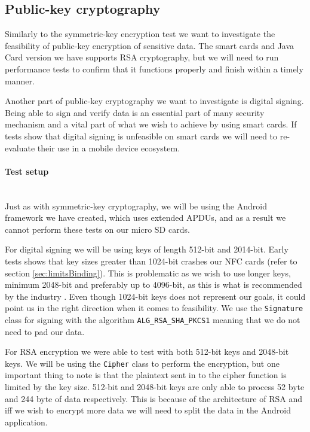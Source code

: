 \subsection{Public-key cryptography}
\label{sec:AsymmetricTest}
Similarly to the symmetric-key encryption test we want to investigate the feasibility of public-key encryption of sensitive data. The smart cards and Java Card version we have supports RSA cryptography, but we will need to run performance tests to confirm that it functions properly and finish within a timely manner.

Another part of public-key cryptography we want to investigate is digital signing. Being able to sign and verify data is an essential part of many security mechanism and a vital part of what we wish to achieve by using smart cards. If tests show that digital signing is unfeasible on smart cards we will need to re-evaluate their use in a mobile device ecosystem.

\paragraph{Test setup}\mbox{}\\
Just as with symmetric-key cryptography, we will be using the Android framework we have created, which uses extended APDUs, and as a result we cannot perform these tests on our micro SD cards.

For digital signing we will be using keys of length 512-bit and 2014-bit. Early tests shows that key sizes greater than 1024-bit crashes our NFC cards (refer to section \ref{sec:limitsBinding}). This is problematic as we wish to use longer keys, minimum 2048-bit and preferably up to 4096-bit, as this is what is recommended by the industry \cite{rsaRec}. Even though 1024-bit keys does not represent our goals, it could point us in the right direction when it comes to feasibility. We use the \texttt{Signature} class for signing with the algorithm \texttt{ALG\_RSA\_SHA\_PKCS1} meaning that we do not need to pad our data.

For RSA encryption we were able to test with both 512-bit keys and 2048-bit keys. We will be using the \texttt{Cipher} class to perform the encryption, but one important thing to note is that the plaintext sent in to the cipher function is limited by the key size. 512-bit and 2048-bit keys are only able to process 52 byte and 244 byte of data respectively. This is because of the architecture of RSA and iff we wish to encrypt more data we will need to split the data in the Android application.

